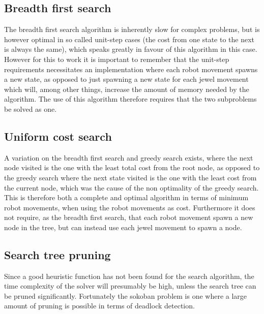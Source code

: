 \subsection*{Breadth first search}
The breadth first search algorithm is inherently slow for complex problems, but is however optimal in so called unit-step cases (the cost from one state to the next is always the same), which speaks greatly in favour of this algorithm in this case. However for this to work it is important to remember that the unit-step requirements necessitates an implementation where each robot movement spawns a new state, as opposed to just spawning a new state for each jewel movement which will, among other things, increase the amount of memory needed by the algorithm. The use of this algorithm therefore requires that the two subproblems be solved as one.

\subsection*{Uniform cost search}
A variation on the breadth first search and greedy search exists, where the next node visited is the one with the least total cost from the root node, as opposed to the greedy search where the next state visited is the one with the least cost from the current node, which was the cause of the non optimality of the greedy search. This is therefore both a complete and optimal algorithm in terms of minimum robot movements, when using the robot movements as cost. Furthermore it does not require, as the breadth first search, that each robot movement spawn a new node in the tree, but can instead use each jewel movement to spawn a node.

\subsection*{Search tree pruning}
Since a good heuristic function has not been found for the search algorithm, the time complexity of the solver will presumably be high, unless the search tree can be pruned significantly. Fortunately the sokoban problem is one where a large amount of pruning is possible in terms of deadlock detection. 

